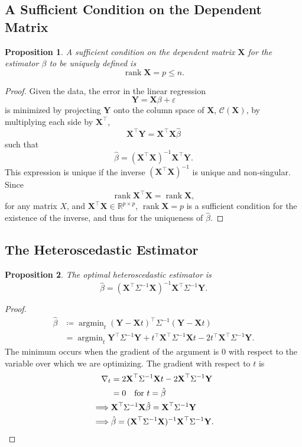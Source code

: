 \documentclass[letterpaper, reqno]{amsart}
\newtheorem{prop}{Proposition}[section]
\numberwithin{equation}{section}
\newcommand{\T}{\top} %
\newcommand{\vect}[1]{\boldsymbol{\mathbf{#1}}} %
\newcommand{\R}{\mathbb{R}}  %
\newcommand{\Xm}{\vect{X}}
\newcommand{\Yv}{\vect{Y}}
\newcommand{\Bv}{\beta}
\newcommand{\Bvh}{\hat{\beta}}
\newcommand{\ve}{\varepsilon}
\DeclareMathOperator*{\argmin}{argmin}
\DeclareMathOperator{\rank}{rank}
\begin{document}
\subsection{A Sufficient Condition on the Dependent Matrix}
\begin{prop}
  A sufficient condition on the dependent matrix $\Xm$ for the estimator $\Bv$ to
  be uniquely defined is
  \[ \rank \Xm = p \le n. \]
\end{prop}

\begin{proof}
  Given the data, the error in the linear regression
  \[ \Yv = \Xm\Bv + \ve \]
  is minimized by projecting $\Yv$ onto the column space of $\Xm$,
  $\mathscr{C}(\Xm)$, by multiplying each side by $\Xm^\T$,
  \[ \Xm^\T\Yv = \Xm^\T\Xm\Bvh \]
  such that
  \[ \Bvh = (\Xm^\T\Xm)^{-1} \Xm^\T \Yv. \]
  This expression is unique if the inverse $(\Xm^\T\Xm)^{-1}$ is unique and non-singular.
  Since
  \[ \rank \Xm^\T\Xm = \rank \Xm, \]
  for any matrix $X$, and $\Xm^\T \Xm \in \R^{p \times p}$, $\rank \Xm = p$ is
  a sufficient condition for the existence of the inverse, and thus for the
  uniqueness of $\Bvh$.
\end{proof}

\subsection{The Heteroscedastic Estimator}
\begin{prop}
  The optimal heteroscedastic estimator is
  \[ \Bvh = (\Xm^\T \Sigma^{-1} \Xm)^{-1} \Xm^\T \Sigma^{-1} \Yv. \]
\end{prop}

\begin{proof}
  \begin{align*}
    \Bvh &\coloneqq \argmin_t (\Yv - \Xm t)^\T \Sigma^{-1} (\Yv - \Xm t) \\
    &= \argmin_t \Yv^\T \Sigma^{-1} \Yv + t^\T \Xm^\T \Sigma^{-1} \Xm t - 2t^\T
    \Xm^\T \Sigma^{-1} \Yv.
  \end{align*}
  The minimum occurs when the gradient of the argument is 0 with respect to the
  variable over which we are optimizing. The gradient with respect to $t$ is
  \begin{align*}
    \nabla_t &= 2 \Xm^\T \Sigma^{-1} \Xm t - 2 \Xm^\T \Sigma^{-1} \Yv \\
             &= 0 \quad \text{for } t = \Bvh \\
    \implies& \Xm^\T \Sigma^{-1} \Xm \Bvh = \Xm^\T \Sigma^{-1} \Yv \\
    \implies& \Bvh = (\Xm^\T \Sigma^{-1} \Xm)^{-1} \Xm^\T \Sigma^{-1} \Yv.
    \qedhere
  \end{align*}
\end{proof}
\end{document}
